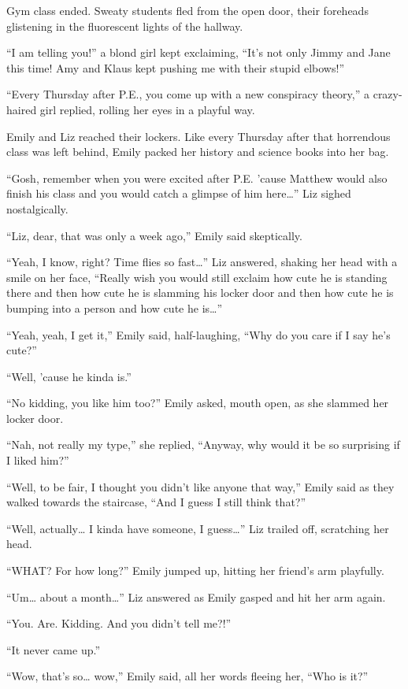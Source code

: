 Gym class ended. Sweaty students fled from the open door, their foreheads glistening in the fluorescent lights of the hallway.

“I am telling you!” a blond girl kept exclaiming, “It's not only Jimmy and Jane this time! Amy and Klaus kept pushing me with their stupid elbows!”

“Every Thursday after P.E., you come up with a new conspiracy theory,” a crazy-haired girl replied, rolling her eyes in a playful way.

Emily and Liz reached their lockers. Like every Thursday after that horrendous class was left behind, Emily packed her history and science books into her bag.

“Gosh, remember when you were excited after P.E. 'cause Matthew would also finish his class and you would catch a glimpse of him here…” Liz sighed nostalgically.

“Liz, dear, that was only a week ago,” Emily said skeptically.

“Yeah, I know, right? Time flies so fast…” Liz answered, shaking her head with a smile on her face, “Really wish you would still exclaim how cute he is standing there and then how cute he is slamming his locker door and then how cute he is bumping into a person and how cute he is…”

“Yeah, yeah, I get it,” Emily said, half-laughing, “Why do you care if I say he's cute?”

“Well, 'cause he kinda is.”

“No kidding, you like him too?” Emily asked, mouth open, as she slammed her locker door.

“Nah, not really my type,” she replied, “Anyway, why would it be so surprising if I liked him?”

“Well, to be fair, I thought you didn't like anyone that way,” Emily said as they walked towards the staircase, “And I guess I still think that?”

“Well, actually… I kinda have someone, I guess…” Liz trailed off, scratching her head.

“WHAT? For how long?” Emily jumped up, hitting her friend's arm playfully.

“Um… about a month…” Liz answered as Emily gasped and hit her arm again.

“You. Are. Kidding. And you didn't tell me?!”

“It never came up.”

“Wow, that's so… wow,” Emily said, all her words fleeing her, “Who is it?”

